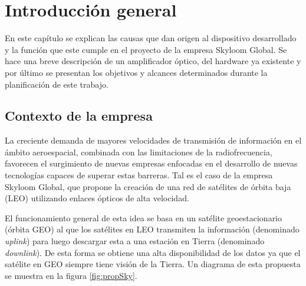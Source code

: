 
\chapter{Introducción general} %

\label{Chapter1} %
\label{IntroGeneral}


\newcommand{\keyword}[1]{\textbf{#1}}
\newcommand{\tabhead}[1]{\textbf{#1}}
\newcommand{\code}[1]{\texttt{#1}}
\newcommand{\file}[1]{\texttt{\bfseries#1}}
\newcommand{\option}[1]{\texttt{\itshape#1}}
\newcommand{\grados}{$^{\circ}$}


En este capítulo se explican las causas que dan origen al dispositivo desarrollado y la función que este cumple en el proyecto de la empresa Skyloom Global. Se hace una breve descripción de un amplificador óptico, del hardware ya existente y por último se presentan los objetivos y alcances determinados durante la planificación de este trabajo.


\section{Contexto de la empresa}
\label{sec:contexto}

La creciente demanda de mayores velocidades de transmisión de información en el ámbito aeroespacial, combinada con las limitaciones de la radiofrecuencia, favorecen el surgimiento de nuevas empresas enfocadas en el desarrollo de nuevas tecnologías capaces de superar estas barreras. Tal es el caso de la empresa Skyloom Global, que propone la creación de una red de satélites de órbita baja (LEO) \citep{WEBSITE:LEO} utilizando enlaces ópticos de alta velocidad.

El funcionamiento general de esta idea se basa en un satélite geoestacionario (órbita GEO) \citep{WEBSITE:GEO} al que los satélites en LEO transmiten la información (denominado \textit{uplink}) para luego descargar esta a una estación en Tierra (denominado \textit{downlink}). De esta forma se obtiene una alta disponibilidad de los datos ya que el satélite en GEO siempre tiene visión de la Tierra. Un diagrama de esta propuesta se muestra en la figura \ref{fig:propSky}.

